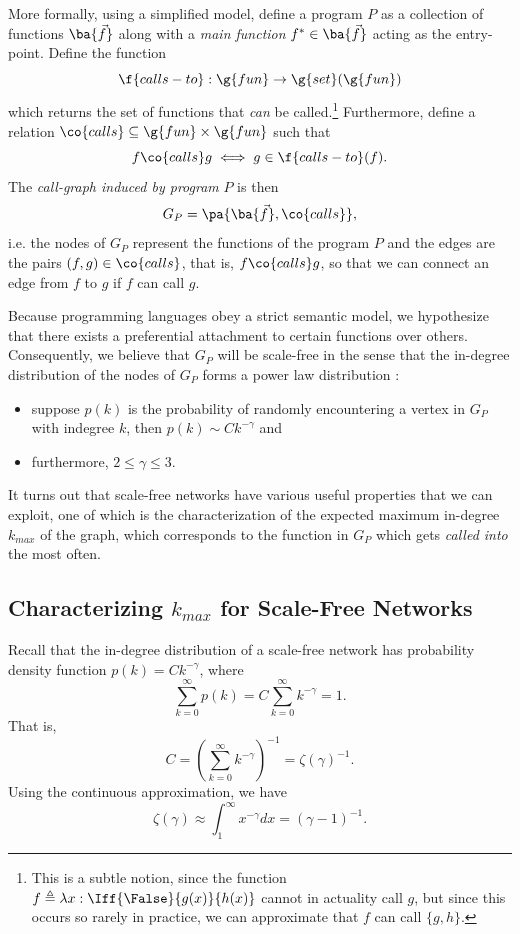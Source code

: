 \documentclass[11pt,a4paper,twocolumn]{article}
\begin{document}
\begin{singlespace}
More formally, using a simplified model, define a program $P$ as a collection
of functions $\ba{\vec{f}}$ along with a \emph{main function}
$f^{\ast}\in\ba{\vec{f}}$ acting as the entry-point. Define the function
\[\f{calls-to}:\g{fun}\to\g{set}(\g{fun})\]
which returns the set of functions that \emph{can} be called.\footnote{This is
a subtle notion, since the function $f\triangleq\lambda x: \Iff{\False}{g(x)}
{h(x)}$ cannot in actuality call $g$, but since this occurs so rarely in
practice, we can approximate that $f$ can call $\{g,h\}$.} Furthermore, define
a relation $\co{calls}\subseteq\g{fun}\times\g{fun}$ such that
\[f\co{calls} g \iff g \in \f{calls-to}(f).\]
The \emph{call-graph induced by program} $P$ is then
\[G_P=\pa{\ba{\vec{f}},\co{calls}},\]
i.e. the nodes of $G_P$ represent the functions of the program $P$ and the
edges are the pairs $(f,g)\in\co{calls}$, that is, $f\co{calls} g$, so that
we can connect an edge from $f$ to $g$ if $f$ can call $g$.

Because programming languages obey a strict semantic model, we hypothesize that
there exists a preferential attachment to certain functions over others.
Consequently, we believe that $G_P$ will be scale-free in the sense that
the in-degree distribution of the nodes of $G_P$ forms a power law
distribution \cite{DUR}:

\begin{itemize}
\item suppose $p(k)$ is the probability of randomly encountering a vertex in $G_P$
with indegree $k$, then $p(k)\sim Ck^{-\gamma}$ and
\item furthermore, $2\leq\gamma\leq 3$.
\end{itemize}

It turns out that scale-free networks have various useful properties that we
can exploit, one of which is the characterization of the expected maximum
in-degree $k_{max}$ of the graph, which corresponds to the function in $G_P$
which gets \emph{called into} the most often.
\subsection{Characterizing $k_{max}$ for Scale-Free Networks}

Recall that the in-degree distribution of a scale-free network has probability
density function $p(k)=Ck^{-\gamma}$, where
\[\sum_{k=0}^{\infty} p(k) = C\sum_{k=0}^{\infty} k^{-\gamma} = 1.\]
That is,
\begin{equation}C=\left(\sum_{k=0}^{\infty} k^{-\gamma}\right)^{-1}
=\zeta(\gamma)^{-1}.\end{equation}
Using the continuous approximation, we have
\begin{equation}\zeta(\gamma)\approx \int_1^{\infty} x^{-\gamma} dx
=(\gamma-1)^{-1}.\end{equation}


\end{singlespace}
\end{document}
